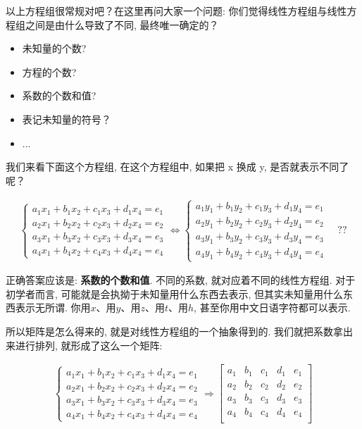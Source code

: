 以上方程组很常规对吧？在这里再问大家一个问题: 你们觉得线性方程组与线性方程组之间是由什么导致了不同, 最终唯一确定的？

\begin{itemize}
  \item 未知量的个数?
  \item 方程的个数?
  \item 系数的个数和值?
  \item 表记未知量的符号？
  \item ...
\end{itemize}

我们来看下面这个方程组, 在这个方程组中, 如果把 x 换成 y, 是否就表示不同了呢？

\begin{align*}
	\begin{cases}
		a_1x_1+b_1x_2+c_1x_3+d_1x_4=e_1 \\
		a_2x_1+b_2x_2+c_2x_3+d_2x_4=e_2 \\
		a_3x_1+b_3x_2+c_3x_3+d_3x_4=e_3 \\
		a_4x_1+b_4x_2+c_4x_3+d_4x_4=e_4 
	\end{cases}
  \iff 
  \begin{cases}
		a_1y_1+b_1y_2+c_1y_3+d_1y_4=e_1 \\
		a_2y_1+b_2y_2+c_2y_3+d_2y_4=e_2 \\
		a_3y_1+b_3y_2+c_3y_3+d_3y_4=e_3 \\
		a_4y_1+b_4y_2+c_4y_3+d_4y_4=e_4 
	\end{cases}
  \quad ??
\end{align*}

正确答案应该是: \textbf{系数的个数和值}. 不同的系数, 就对应着不同的线性方程组. 对于初学者而言, 可能就是会执拗于未知量用什么东西去表示, 但其实未知量用什么东西表示无所谓. 你用$x$、用$y$、用$z$、用$t$、用$h$, 甚至你用中文日语字符都可以表示. 

所以矩阵是怎么得来的, 就是对线性方程组的一个抽象得到的. 我们就把系数拿出来进行排列, 就形成了这么一个矩阵:

\begin{align*}
	\begin{cases}
		a_1x_1+b_1x_2+c_1x_3+d_1x_4=e_1 \\
		a_2x_1+b_2x_2+c_2x_3+d_2x_4=e_2 \\
		a_3x_1+b_3x_2+c_3x_3+d_3x_4=e_3 \\
		a_4x_1+b_4x_2+c_4x_3+d_4x_4=e_4 
	\end{cases}
  \Rightarrow
  \begin{bmatrix}
      a_{1} & b_{1} & c_{1} & d_{1} & e_{1} \\
      a_{2} & b_{2} & c_{2} & d_{2} & e_{2} \\
      a_{3} & b_{3} & c_{3} & d_{3} & e_{3} \\
      a_{4} & b_{4} & c_{4} & d_{4} & e_{4} \\
  \end{bmatrix}
\end{align*}

